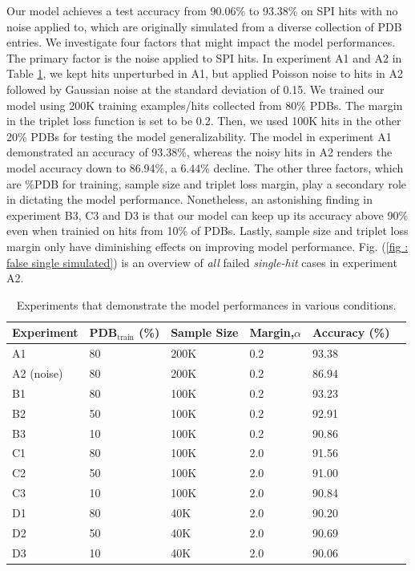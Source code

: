 Our model achieves a test accuracy from 90.06\% to 93.38\% on SPI hits with no
noise applied to, which are originally simulated from a diverse collection of
PDB entries.  We investigate four factors that might impact the model
performances.  The primary factor is the noise applied to SPI hits.  In
experiment A1 and A2 in Table \ref{tb : simulated performance}, we kept hits
unperturbed in A1, but applied Poisson noise to hits in A2 followed by Gaussian
noise at the standard deviation of 0.15.  We trained our model using 200K
training examples/hits collected from 80\% PDBs.  The margin in the triplet loss
function is set to be 0.2.  Then, we used 100K hits in the other 20\% PDBs for
testing the model generalizability.  The model in experiment A1 demonstrated an
accuracy of 93.38\%, whereas the noisy hits in A2 renders the model accuracy
down to 86.94\%, a 6.44\% decline.  The other three factors, which are \%PDB for
training, sample size and triplet loss margin, play a secondary role in
dictating the model performance.  Nonetheless, an astonishing finding in
experiment B3, C3 and D3 is that our model can keep up its accuracy above 90\%
even when trainied on hits from 10\% of PDBs.  Lastly, sample size and triplet
loss margin only have diminishing effects on improving model performance.  Fig.
(\ref{fig : false single simulated}) is an overview of \textit{all} failed
\textit{single-hit} cases in experiment A2.


\begin{table}
    \caption{Experiments that demonstrate the model performances in various
    conditions.}
    \label{tb : simulated performance}
    \begin{tabularx}{\linewidth}{ l | X X X X X }
        Experiment  &
        PDB$_{\text{train}}$ (\%) &
        Sample Size &
        Margin,$\alpha$ &
        Accuracy (\%) \\
        \hline
        A1  & 80 & 200K &  0.2 & 93.38 \\
        A2 (noise)  & 80 & 200K &  0.2 & 86.94 \\
        \hline
        B1  & 80 & 100K &  0.2 & 93.23 \\
        B2  & 50 & 100K &  0.2 & 92.91 \\
        B3  & 10 & 100K &  0.2 & 90.86 \\
        \hline
        C1  & 80 & 100K &  2.0 & 91.56 \\
        C2  & 50 & 100K &  2.0 & 91.00 \\
        C3  & 10 & 100K &  2.0 & 90.84 \\
        \hline
        D1  & 80 & 40K  &  2.0 & 90.20 \\
        D2  & 50 & 40K  &  2.0 & 90.69 \\
        D3  & 10 & 40K  &  2.0 & 90.06 \\
    \end{tabularx}
\end{table}


